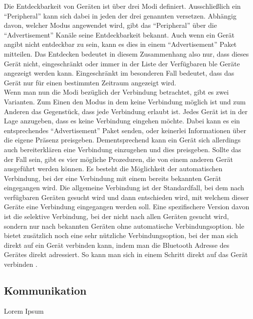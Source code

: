\noindent Die Entdeckbarkeit von Geräten ist über drei Modi definiert. Ausschließlich ein "`Peripheral"' kann sich dabei in jeden der drei genannten versetzen. Abhängig davon, welcher Modus angewendet wird, gibt das "`Peripheral"' über die "`Advertisement"' Kanäle seine Entdeckbarkeit bekannt. Auch wenn ein Gerät angibt nicht entdeckbar zu sein, kann es dies in einem "`Advertisement"' Paket mitteilen. Das Entdecken bedeutet in diesem Zusammenhang also nur, dass dieses Gerät nicht, eingeschränkt oder immer in der Liste der Verfügbaren \ac{ble} Geräte angezeigt werden kann. Eingeschränkt im besonderen Fall bedeutet, dass das Gerät nur für einen bestimmten Zeitraum angezeigt wird.\\

\noindent Wenn man nun die Modi bezüglich der Verbindung betrachtet, gibt es zwei Varianten. Zum Einen den Modus in dem keine Verbindung möglich ist und zum Anderen das Gegenstück, dass jede Verbindung erlaubt ist. Jedes Gerät ist in der Lage anzugeben, dass es keine Verbindung eingehen möchte. Dabei kann es ein entsprechendes "`Advertisement"' Paket senden, oder keinerlei Informationen über die eigene Präsenz preisgeben. Dementsprechend kann ein Gerät sich allerdings auch bereiterklären eine Verbindung einzugehen und dies preisgeben. Sollte das der Fall sein, gibt es vier mögliche Prozeduren, die von einem anderen Gerät ausgeführt werden können. Es besteht die Möglichkeit der automatischen Verbindung, bei der eine Verbindung mit einem bereits bekannten Gerät eingegangen wird. Die allgemeine Verbindung ist der Standardfall, bei dem nach verfügbaren Geräten gesucht wird und dann entschieden wird, mit welchem dieser Geräte eine Verbindung eingegangen werden soll. Eine spezifischere Version davon ist die selektive Verbindung, bei der nicht nach allen Geräten gesucht wird, sondern nur nach bekannten Geräten ohne automatische Verbindungsoption. \ac{ble} bietet zusätzlich noch eine sehr nützliche Verbindungsoption, bei der man sich direkt auf ein Gerät verbinden kann, indem man die Bluetooth Adresse des Gerätes direkt adressiert. So kann man sich in einem Schritt direkt auf das Gerät verbinden \cite[Seite 38ff]{Townsend14:GSB}.\\      

\subsection{Kommunikation}
\label{ss:funktionsweise:kommunkation}

Lorem Ipsum


